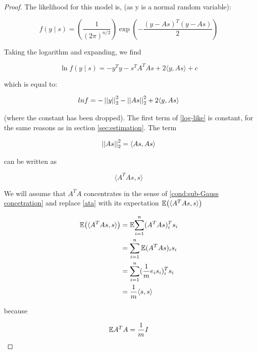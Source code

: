 \documentclass{article}
\begin{document}
\begin{proof}
The likelihood for this model is, (as y is a normal random variable):

\begin{equation}
f\left(y \mid s\right) = \left(\frac{1}{\left(2\pi\right)^{n/2}} \right)\exp{\left( - \frac{\left(y-As\right)^T  \left(y-As\right)}{2} \right)}
\end{equation}

Taking the logarithm and expanding, we find

\begin{equation}
\ln{f\left(y \mid s\right)} = -y^Ty - s^TA^TAs + 2\langle y, As \rangle + c
\end{equation}

which is equal to:

\begin{equation}
ln{f} = - \left|\left|y\right|\right|_2^2 - \left|\left|As\right|\right|_2^2 + 2\langle y, As \rangle
\label{log-like}
\end{equation}

(where the constant has been dropped). The first term of \eqref{log-like} is constant, for the same reasons as in section \eqref{sec:estimation}. The term 

\begin{equation}
\left|\left|As\right|\right|^2_2 = \langle As, As\rangle
\end{equation}

can be written as 

\begin{equation}
\langle A^T As, s\rangle
\label{ata}
\end{equation}

We will assume that \(A^TA\) concentrates in the sense of \ref{cond:sub-Gauss concetration} and replace \ref{ata} with its expectation \({\mathbb{E}}{\left( \langle A^T As, s\rangle \right)}\)

\begin{align*}
{\mathbb{E}}{\left(\langle A^T As, s\rangle\right)} &=  {\mathbb{E}}{\sum_{i=1}^n (A^TAs)^T_i s_i} \\
&= \sum_{i=1}^n {\mathbb{E}}{(A^TAs)_i s_i} \\
&= \sum_{i=1}^n (\frac{1}{m}e_i s_i)^T_i s_i \\
&= \frac{1}{m} \langle s, s \rangle
\end{align*}

because

\begin{equation}
{\mathbb{E}}{A^TA} = \frac{1}{m}I
\end{equation}


\end{proof}
\end{document}
